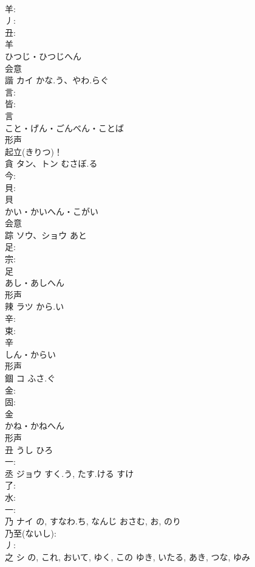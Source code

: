 \documentclass[8pt]{extreport}
\begin{document}
\begin{CJK}{UTF8}{min}
\\	羊: 
\\	丿: 
\\	丑: 
\\	羊	
\\	ひつじ・ひつじへん	
\\	会意 
\\	諧	カイ	かな.う、やわ.らぐ		
\\	言: 
\\	皆: 
\\	言	
\\	こと・げん・ごんべん・ことば	
\\	形声 
\\	起立(きりつ)！ 
\\	貪	タン、トン	むさぼ.る		
\\	今: 
\\	貝: 
\\	貝	
\\	かい・かいへん・こがい	
\\	会意 
\\	踪	ソウ、ショウ	あと		
\\	足: 
\\	宗: 
\\	足	
\\	あし・あしへん	
\\	形声 
\\	辣	ラツ	から.い		
\\	辛: 
\\	束: 
\\	辛	
\\	しん・からい	
\\	形声 
\\	錮	コ	ふさ.ぐ		
\\	金: 
\\	固: 
\\	金	
\\	かね・かねへん	
\\	形声 
\\	丑		うし	ひろ			
\\	一: 
\\	丞	ジョウ	すく.う, たす.ける	すけ	
\\	了: 
\\	水: 
\\	一: 
\\	乃	ナイ	の, すなわ.ち, なんじ	おさむ, お, のり	
\\	乃至(ないし): 
\\	丿: 
\\	之	シ	の, これ, おいて, ゆく, この	ゆき, いたる, あき, つな, ゆみ	

\end{CJK}
\end{document}
